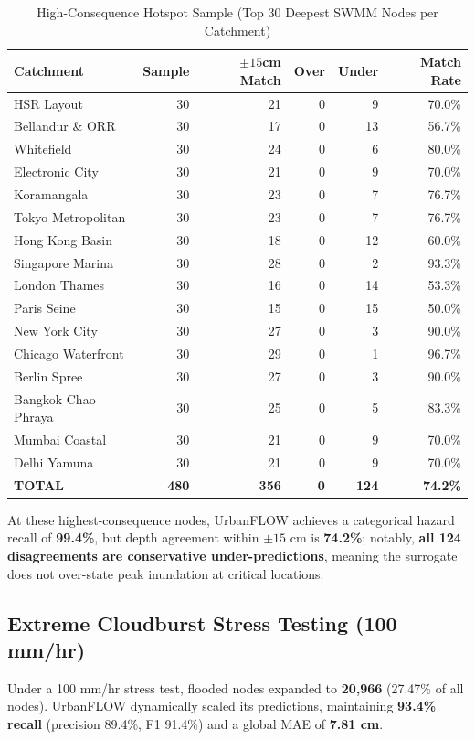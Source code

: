 \documentclass[conference]{IEEEtran}
\begin{document}
\begin{table}[h]
\caption{High-Consequence Hotspot Sample (Top 30 Deepest SWMM Nodes per Catchment)}
\label{tab:hotspot_audit}
\centering
\small
\begin{tabular}{lrrrrr}
\toprule
\textbf{Catchment} & \textbf{Sample} & \textbf{$\pm 15$cm Match} & \textbf{Over} & \textbf{Under} & \textbf{Match Rate} \\
\midrule
HSR Layout & 30 & 21 & 0 & 9 & 70.0\% \\
Bellandur \& ORR & 30 & 17 & 0 & 13 & 56.7\% \\
Whitefield & 30 & 24 & 0 & 6 & 80.0\% \\
Electronic City & 30 & 21 & 0 & 9 & 70.0\% \\
Koramangala & 30 & 23 & 0 & 7 & 76.7\% \\
Tokyo Metropolitan & 30 & 23 & 0 & 7 & 76.7\% \\
Hong Kong Basin & 30 & 18 & 0 & 12 & 60.0\% \\
Singapore Marina & 30 & 28 & 0 & 2 & 93.3\% \\
London Thames & 30 & 16 & 0 & 14 & 53.3\% \\
Paris Seine & 30 & 15 & 0 & 15 & 50.0\% \\
New York City & 30 & 27 & 0 & 3 & 90.0\% \\
Chicago Waterfront & 30 & 29 & 0 & 1 & 96.7\% \\
Berlin Spree & 30 & 27 & 0 & 3 & 90.0\% \\
Bangkok Chao Phraya & 30 & 25 & 0 & 5 & 83.3\% \\
Mumbai Coastal & 30 & 21 & 0 & 9 & 70.0\% \\
Delhi Yamuna & 30 & 21 & 0 & 9 & 70.0\% \\
\midrule
\textbf{TOTAL} & \textbf{480} & \textbf{356} & \textbf{0} & \textbf{124} & \textbf{74.2\%} \\
\bottomrule
\end{tabular}
\end{table}

At these highest-consequence nodes, UrbanFLOW achieves a categorical hazard recall of \textbf{99.4\%}, but depth agreement within $\pm 15\text{ cm}$ is \textbf{74.2\%}; notably, \textbf{all 124 disagreements are conservative under-predictions}, meaning the surrogate does not over-state peak inundation at critical locations.

\subsection{Extreme Cloudburst Stress Testing (100 mm/hr)}
Under a 100 mm/hr stress test, flooded nodes expanded to \textbf{20,966} (27.47\% of all nodes). UrbanFLOW dynamically scaled its predictions, maintaining \textbf{93.4\% recall} (precision 89.4\%, F1 91.4\%) and a global MAE of \textbf{7.81 cm}.
\end{document}

